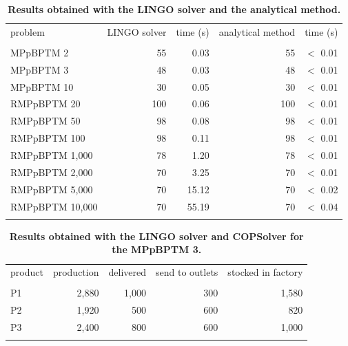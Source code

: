\documentclass[10pt,fleqn,a4paper,twoside]{article}
\begin{document}
\begin{table}[ht]
\begin{center}
\caption{\textbf{Results obtained with the LINGO solver and the analytical method.}}
\begin{footnotesize}
\begin{tabular}[c]{l r r r r}
\\
problem & LINGO solver & time (s) & analytical method & time (s) \\
\cline {1-5} \\
MPpBPTM 2 & 55 & 0.03 & 55 & $<$ 0.01 \\
MPpBPTM 3 & 48 & 0.03 & 48 & $<$ 0.01 \\
MPpBPTM 10 & 30 & 0.05 & 30 & $<$ 0.01 \\
RMPpBPTM 20 & 100 & 0.06 & 100 & $<$ 0.01 \\
RMPpBPTM 50 & 98 & 0.08 & 98 & $<$ 0.01 \\
RMPpBPTM 100 & 98 & 0.11 & 98 & $<$ 0.01 \\
RMPpBPTM 1,000 & 78 & 1.20 & 78 & $<$ 0.01 \\
RMPpBPTM 2,000 & 70 & 3.25 & 70 & $<$ 0.01 \\
RMPpBPTM 5,000 & 70 & 15.12 & 70 & $<$ 0.02 \\
RMPpBPTM 10,000 & 70 & 55.19 & 70 & $<$ 0.04 \\
\cline {1-5} \\
\end{tabular}
\label{tab:results}
\end{footnotesize}
\end{center}
\end{table}

\begin{table}[ht]
\begin{center}
\caption{\textbf{Results obtained with the LINGO solver and COPSolver for the MPpBPTM 3.}}
\begin{footnotesize}
\begin{tabular}[c]{l r r r r}
\\
product & production & delivered & send to outlets & stocked in factory \\
\cline {1-5} \\
P1 & 2,880 & 1,000 & 300 & 1,580 \\
P2 & 1,920 & 500 & 600 & 820 \\
P3 & 2,400 & 800 & 600 & 1,000 \\
\cline {1-5} \\
\end{tabular}
\label{tab:compResultsMBPTMP2}
\end{footnotesize}
\end{center}
\end{table}
\end{document}
